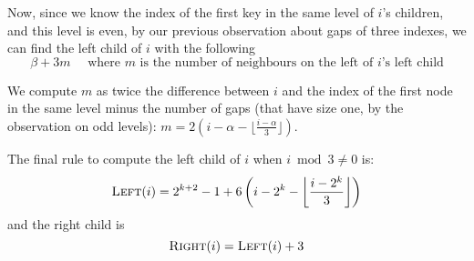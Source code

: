 Now, since we know the index of the first key in the same level of $i$'s children, and this level is even, by our previous observation about gaps of three indexes, we can find the left child of $i$ with the following $$\beta+3m \quad \text{ where $m$ is the number of neighbours on the left of $i$'s left child}$$

We compute $m$ as twice the difference between $i$ and the index of the first node in the same level minus the number of gaps (that have size one, by the observation on odd levels): $m=2(i-\alpha-\lfloor \frac{i-\alpha}{3} \rfloor)$.

The final rule to compute the left child of $i$ when $i \bmod 3 \neq 0$ is: $$\textsc{Left}(i)=2^{k+2}-1+6\left(i-2^k- \left\lfloor \frac{i-2^k}{3} \right\rfloor\right)$$ and the right child is $$\textsc{Right}(i)=\textsc{Left}(i)+3$$


